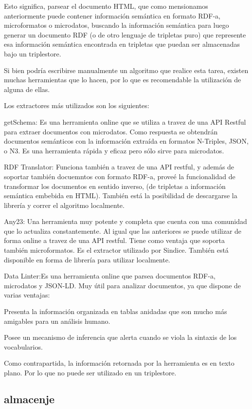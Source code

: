 Esto significa, parsear el documento HTML, que como mensionamos anteriormente puede contener información semántica en formato RDF-a, microformatos o microdatos, buscando 
la información semántica para luego generar un documento RDF (o de otro lenguaje de tripletas puro) que represente esa información semántica encontrada en tripletas que puedan ser almacenadas bajo un triplestore.

Si bien podría escribirse manualmente un algoritmo que realice esta tarea, existen muchas herramientas que lo hacen, por lo que es recomendable la utilización de alguna de ellas.

Los extractores más utilizados son los siguientes:

getSchema: Es una herramienta online que se utiliza a travez de una API Restful para extraer documentos con microdatos. Como respuesta se obtendrán documentos semánticos 
con la información extraída en formatos N-Triples, JSON, o N3. 
Es una herramienta rápida y eficaz pero sólo sirve para microdatos.

RDF Translator: Funciona también a travez de una API restful, y además de soportar también docuemntos con formato RDF-a, proveé la funcionalidad de transformar los documentos en sentido inverso, 
(de tripletas a información semántica embebida en HTML). 
También está la posibilidad de descargarse la librería y correr el algoritmo localmente.

Any23: Una herramienta muy potente y completa que cuenta con una comunidad que lo actualiza constantemente. Al igual que las anteriores se puede utilizar de forma online a travez 
de una API restful. Tiene como ventaja que soporta también microformatos. Es el extractor utilizado por Sindice. 
También está disponible en forma de librería para utilizar localmente.

Data Linter:Es una herramienta online que parsea documentos RDF-a, microdatos y JSON-LD.  
Muy útil para analizar documentos, ya que dispone de varias ventajas: 

Presenta la información organizada en tablas anidadas que son mucho más amigables para un análisis humano. 

Posee un mecanismo de inferencia que alerta cuando se viola la sintaxis de los vocabularios.

Como contrapartida, la información retornada por la herramienta es en texto plano. Por lo que no puede ser utilizado en un triplestore.


\subsection{almacenje}

